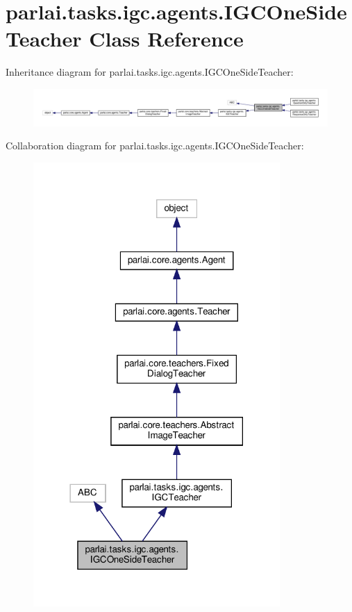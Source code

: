 \hypertarget{classparlai_1_1tasks_1_1igc_1_1agents_1_1IGCOneSideTeacher}{}\section{parlai.\+tasks.\+igc.\+agents.\+I\+G\+C\+One\+Side\+Teacher Class Reference}
\label{classparlai_1_1tasks_1_1igc_1_1agents_1_1IGCOneSideTeacher}


Inheritance diagram for parlai.\+tasks.\+igc.\+agents.\+I\+G\+C\+One\+Side\+Teacher\+:
\nopagebreak
\begin{figure}[H]
\begin{center}
\leavevmode
\includegraphics[width=350pt]{d0/db7/classparlai_1_1tasks_1_1igc_1_1agents_1_1IGCOneSideTeacher__inherit__graph}
\end{center}
\end{figure}


Collaboration diagram for parlai.\+tasks.\+igc.\+agents.\+I\+G\+C\+One\+Side\+Teacher\+:
\nopagebreak
\begin{figure}[H]
\begin{center}
\leavevmode
\includegraphics[width=266pt]{d8/dab/classparlai_1_1tasks_1_1igc_1_1agents_1_1IGCOneSideTeacher__coll__graph}
\end{center}
\end{figure}
